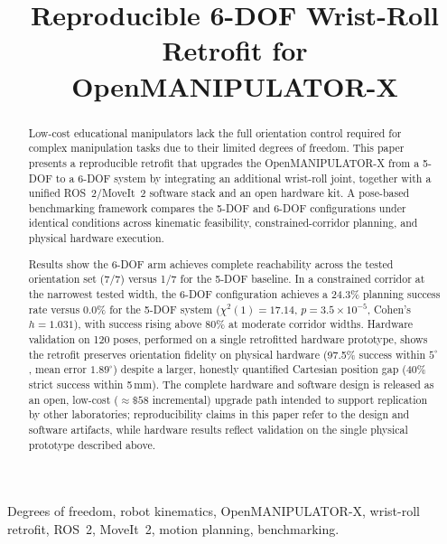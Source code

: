 \documentclass[conference]{IEEEtran}
\begin{document}
	
	\title{Reproducible 6-DOF Wrist-Roll Retrofit for OpenMANIPULATOR-X}
	
	\author{
	}
	
	\maketitle
	
	\begin{abstract}
		Low-cost educational manipulators lack the full orientation control
		required for complex manipulation tasks due to their limited degrees
		of freedom. This paper presents a reproducible retrofit that upgrades
		the OpenMANIPULATOR-X from a 5-DOF to a 6-DOF system by integrating an
		additional wrist-roll joint, together with a unified ROS~2/MoveIt~2
		software stack and an open hardware kit. A pose-based benchmarking
		framework compares the 5-DOF and 6-DOF configurations under identical
		conditions across kinematic feasibility, constrained-corridor
		planning, and physical hardware execution.
		
		Results show the 6-DOF arm achieves complete reachability across the
		tested orientation set (7/7) versus 1/7 for the 5-DOF baseline. In a
		constrained corridor at the narrowest tested width, the 6-DOF
		configuration achieves a 24.3\% planning success rate versus 0.0\%
		for the 5-DOF system ($\chi^2(1){=}17.14$, $p{=}3.5{\times}10^{-5}$,
		Cohen's $h{=}1.031$), with success rising above 80\% at moderate
		corridor widths. Hardware validation on 120 poses, performed on a
		single retrofitted hardware prototype, shows the retrofit preserves
		orientation fidelity on physical hardware (97.5\% success within
		$5^\circ$, mean error $1.89^\circ$) despite a larger, honestly
		quantified Cartesian position gap (40\% strict success within
		5\,mm). The complete hardware and software design is released as an
		open, low-cost (${\approx}\$58$ incremental) upgrade path intended
		to support replication by other laboratories; reproducibility
		claims in this paper refer to the design and software artifacts,
		while hardware results reflect validation on the single physical
		prototype described above.
	\end{abstract}
	
	\begin{IEEEkeywords}
		Degrees of freedom, robot kinematics, OpenMANIPULATOR-X, wrist-roll
		retrofit, ROS~2, MoveIt~2, motion planning, benchmarking.
	\end{IEEEkeywords}
	
\end{document}
